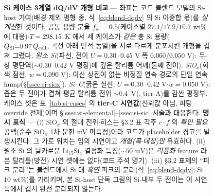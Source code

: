 \begin{figure}[t]
\caption{\textbf{Si 케이스 3계열 dQ/dV 개형 비교} --- 좌표는 코드
블렌드 모델의 Si-host 기여(배경 제외 평형 종, 식~\eqref{eq:blend-dqdv}
의 Si 이중합 몫)를 \emph{실계산}한 것이다. 공통 용량 분율 $f_\mathrm{Si}{=}0.5$(케이스별 $27.1/17.9/10.7$
wt\% 에 대응)$\cdot$$T{=}298.15$~K 에서 세 케이스가 \emph{같은} 총 Si 용량($Q_\mathrm{Si}{=}0.97\,Q_{\mathrm{cell}}$,
곡선 아래 면적 동일)을 서로 다르게 분포시킨 개형을 겹쳐 그렸다. \emph{원소 Si}(파선, 전이 $U{=}0.30\cdot0.45$
V$\cdot$폭 $0.060/0.050$ V): 두-상 평탄역($\sim$$0.30$--$0.42$ V 평정)에 깊은-탈리튬 어깨(둘째 전이). \emph{SiO$_x$}(회색
점선, $w{=}0.090$ V): 이산 상전이 없는 비정질 연속 경로의 단일 연속 hump(\S\ref{ssec:si-siox}). \emph{Si--C}(굵은
실선, $U{=}0.30\cdot0.42$ V$\cdot$$w{=}0.050$ V): 좁은 두 전이가 겹쳐 평균 탈리튬 전위 $\sim$$0.4$~V(\cite{andersen_sic2019},
tier-A)를 감싼 평정부. 케이스 셋은 표~\ref{tab:si-cases} 의 \textbf{tier-C 시연값}(신뢰값 아님, 피팅 override
전제)이며 \S\ref{ssec:si-elemental}--\ref{ssec:si-sic} 서술과 대응한다. \textbf{명시 표식} --- (i) SiO$_x$ 의
절대 전위$\cdot$히스는 §3.2 표 각주 $c\cdot f$ 의 \emph{확인 필요} 공백(순수 SiO$_x$ 1차 문헌 mV 미특정)이라 코드가
placeholder 경고를 발생시킨다; 그 가로 위치는 임의 시연이고 \emph{개형(폭$\cdot$대칭)만} 유효하다. (ii) 원소 Si 의
날카로운 Li$_{15}$Si$_4$ 결정화 특징($\sim$$50$ mV)은 \emph{리튬화} feature 라 본 탈리튬(방전) 시연 셋에는 없다(코드
주석 명기). (iii) §3.2 표제의 ``피크 분리''는 블렌드에서 Si 대 \emph{흑연} 피크의 분리(식~\eqref{eq:blend-dqdv};
Si $10$ wt\%\cite{naboka_sic2021})를 가리키며, 본 Si-host 단독 그림의 Si-내부 두 전이는 이 시연 폭에서 겹쳐 완전
분리되지 않는다.}
\label{fig:si-cases-shape}
\end{figure}
